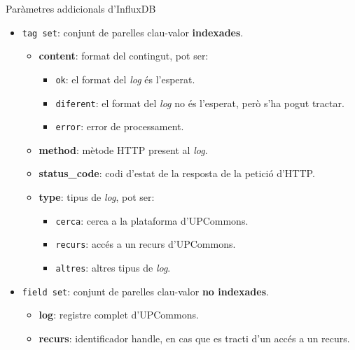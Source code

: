 \begin{frame}{Paràmetres addicionals d'InfluxDB}
    \begin{itemize}%
        \item \texttt{tag set}: conjunt de parelles clau-valor \textbf{indexades}.
        \begin{itemize}
            \item \textbf{content}: format del contingut, pot ser:
            \begin{itemize}
                \item \texttt{ok}: el format del \textit{log} és l'esperat.
                \item \texttt{diferent}: el format del \textit{log} no és l'esperat, però s'ha pogut tractar.
                \item \texttt{error}: error de processament.
            \end{itemize}
            \item \textbf{method}: mètode HTTP present al \textit{log}.
            \item \textbf{status\_code}: codi d'estat de la resposta de la petició d'HTTP.
            \item \textbf{type}: tipus de \textit{log}, pot ser:
            \begin{itemize}
                \item \texttt{cerca}: cerca a la plataforma d'UPCommons.
                \item \texttt{recurs}: accés a un recurs d'UPCommons.
                \item \texttt{altres}: altres tipus de \textit{log}.
            \end{itemize}
        \end{itemize}
        \item \texttt{field set}: conjunt de parelles clau-valor \textbf{no indexades}.
        \begin{itemize}
            \item \textbf{log}: registre complet d'UPCommons.
            \item \textbf{recurs}: identificador handle, en cas que es tracti d'un accés a un recurs.
        \end{itemize}
    \end{itemize}
\end{frame}



